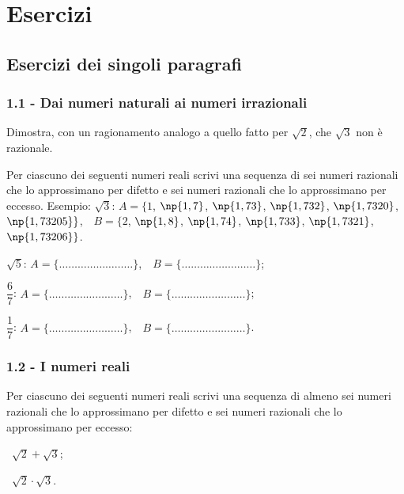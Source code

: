\section{Esercizi}
\subsection{Esercizi dei singoli paragrafi}
\subsubsection*{1.1 - Dai numeri naturali ai numeri irrazionali}

\begin{esercizio}
\label{ese:1.1}
Dimostra, con un ragionamento analogo a quello fatto per $\sqrt 2$, che $\sqrt 3$ non è razionale.
\end{esercizio}

\begin{esercizio}
\label{ese:1.2}
Per ciascuno dei seguenti numeri reali scrivi una sequenza di sei numeri razionali che lo approssimano per difetto e sei numeri razionali che lo approssimano per eccesso. Esempio:
$\sqrt{3}$: $A=\{1$, $\np{1,7}$, $\np{1,73}$, $\np{1,732}$, $\np{1,7320}$, $\np{1,73205}\}$,$\quad B=\{2$, $\np{1,8}$, $\np{1,74}$, $\np{1,733}$, $\np{1,7321}$, $\np{1,73206}\}$.
\begin{enumeratea}
 \item$\sqrt{5}$: $A=\{\ldots\ldots\ldots\ldots\ldots\ldots\ldots\ldots\}$,$\quad B=\{\ldots\ldots\ldots\ldots\ldots\ldots\ldots\ldots\}$;
 \item$\dfrac{6}{7}$: $A=\{\ldots\ldots\ldots\ldots\ldots\ldots\ldots\ldots\}$,$\quad B=\{\ldots\ldots\ldots\ldots\ldots\ldots\ldots\ldots\}$;
 \item$\dfrac{1}{7}$: $A=\{\ldots\ldots\ldots\ldots\ldots\ldots\ldots\ldots\}$,$\quad B=\{\ldots\ldots\ldots\ldots\ldots\ldots\ldots\ldots\}$.
\end{enumeratea}
\end{esercizio}

\subsubsection*{1.2 - I numeri reali}

\begin{esercizio}
\label{ese:1.3}
Per ciascuno dei seguenti numeri reali scrivi una sequenza di almeno sei numeri razionali che lo approssimano per difetto e sei numeri razionali che lo approssimano per eccesso:
\begin{multicols}{2}
\begin{enumeratea}
 \item~$\sqrt{2}+\sqrt{3}$;
 \item~$\sqrt{2}\cdot\sqrt{3}$.
\end{enumeratea}
\end{multicols}
\end{esercizio}

